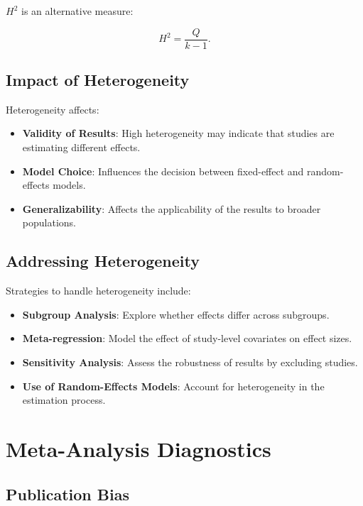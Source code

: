 \documentclass[12pt,a4paper]{report}
\begin{document}
$H^2$ is an alternative measure:

\begin{equation}
\label{eq:h_squared}
H^2 = \frac{Q}{k - 1}.
\end{equation}

\section{Impact of Heterogeneity}
\label{sec:impact_heterogeneity}

Heterogeneity affects:

\begin{itemize}
    \item \textbf{Validity of Results}: High heterogeneity may indicate that studies are estimating different effects.
    \item \textbf{Model Choice}: Influences the decision between fixed-effect and random-effects models.
    \item \textbf{Generalizability}: Affects the applicability of the results to broader populations.
\end{itemize}

\section{Addressing Heterogeneity}
\label{sec:addressing_heterogeneity}

Strategies to handle heterogeneity include:

\begin{itemize}
    \item \textbf{Subgroup Analysis}: Explore whether effects differ across subgroups.
    \item \textbf{Meta-regression}: Model the effect of study-level covariates on effect sizes.
    \item \textbf{Sensitivity Analysis}: Assess the robustness of results by excluding studies.
    \item \textbf{Use of Random-Effects Models}: Account for heterogeneity in the estimation process.
\end{itemize}

\chapter{Meta-Analysis Diagnostics}
\label{chap:diagnostics}

\section{Publication Bias}
\label{sec:publication_bias}
\end{document}

